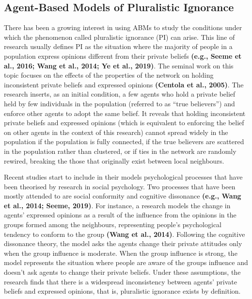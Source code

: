 \documentclass[
  11pt,
]{article}
\begin{document}
\hypertarget{agent-based-models-of-pluralistic-ignorance}{%
\subsection{Agent-Based Models of Pluralistic
Ignorance}\label{agent-based-models-of-pluralistic-ignorance}}

There has been a growing interest in using ABMs to study the conditions
under which the phenomenon called pluralistic ignorance (PI) can arise.
This line of research usually defines PI as the situation where the
majority of people in a population express opinions different from their
private beliefs \textbf{(e.g., Seeme et al., 2016; Wang et al., 2014; Ye
et al., 2019)}. The seminal work on this topic focuses on the effects of
the properties of the network on holding inconsistent private beliefs
and expressed opinions \textbf{(Centola et al., 2005)}. The research
inserts, as an initial condition, a few agents who hold a private belief
held by few individuals in the population (referred to as ``true
believers'') and enforce other agents to adopt the same belief. It
reveals that holding inconsistent private beliefs and expressed opinions
(which is equivalent to enforcing the belief on other agents in the
context of this research) cannot spread widely in the population if the
population is fully connected, if the true believers are scattered in
the population rather than clustered, or if ties in the network are
randomly rewired, breaking the those that originally exist between local
neighbours.

Recent studies start to include in their models psychological processes
that have been theorised by research in social psychology. Two processes
that have been mostly attended to are social conformity and cognitive
dissonance \textbf{(e.g., Wang et al., 2014; Seeme, 2019)}. For
instance, a research models the change in agents' expressed opinions as
a result of the influence from the opinions in the groups formed among
the neighbours, representing people's psychological tendency to conform
to the group \textbf{(Wang et al., 2014)}. Following the cognitive
dissonance theory, the model asks the agents change their private
attitudes only when the group influence is moderate. When the group
influence is strong, the model represents the situation where people are
aware of the groups influence and doesn't ask agents to change their
private beliefs. Under these assumptions, the research finds that there
is a widespread inconsistency between agents' private beliefs and
expressed opinions, that is, pluralistic ignorance exists by definition.
\end{document}
